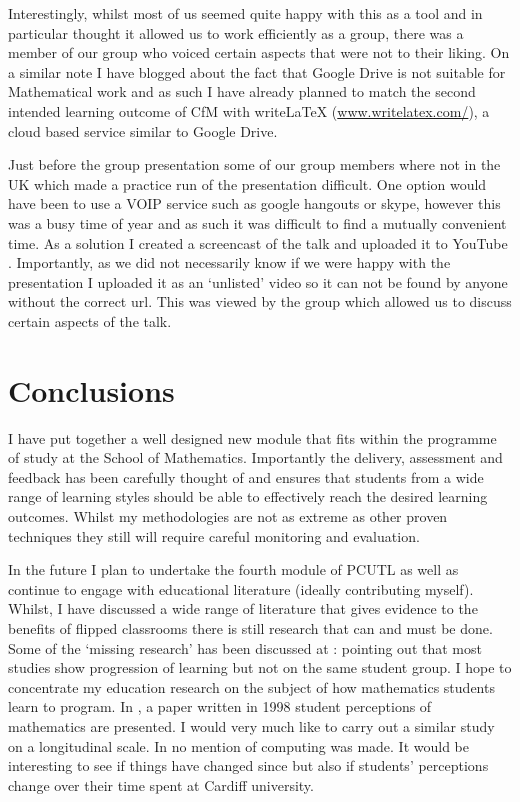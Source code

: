 \documentclass{article}
\begin{document}
Interestingly, whilst most of us seemed quite happy with this as a tool and in particular thought it allowed us to work efficiently as a group, there was a member of our group who voiced certain aspects that were not to their liking. On a similar note I have blogged about the fact that Google Drive is not suitable for Mathematical work \cite{knight_using_2012} and as such I have already planned to match the second intended learning outcome of CfM with writeLaTeX (\url{www.writelatex.com/}), a cloud based service similar to Google Drive.

Just before the group presentation some of our group members where not in the UK which made a practice run of the presentation difficult. One option would have been to use a VOIP service such as google hangouts or skype, however this was a busy time of year and as such it was difficult to find a mutually convenient time. As a solution I created a screencast of the talk and uploaded it to YouTube \cite{vincent_knight_understanding_2013}. Importantly, as we did not necessarily know if we were happy with the presentation I uploaded it as an `unlisted' video so it can not be found by anyone without the correct url. This was viewed by the group which allowed us to discuss certain aspects of the talk.

\section{Conclusions}

I have put together a well designed new module that fits within the programme of study at the School of Mathematics. Importantly the delivery, assessment and feedback has been carefully thought of and ensures that students from a wide range of learning styles should be able to effectively reach the desired learning outcomes. Whilst my methodologies are not as extreme as other proven techniques \cite{davis_how_2013} they still will require careful monitoring and evaluation.

In the future I plan to undertake the fourth module of PCUTL as well as continue to engage with educational literature (ideally contributing myself). Whilst, I have discussed a wide range of literature that gives evidence to the benefits of flipped classrooms there is still research that can and must be done. Some of the `missing research' has been discussed at \cite{weinberg_reviewing_2013}: pointing out that most studies show progression of learning but not on the same student group.  I hope to concentrate my education research on the subject of how mathematics students learn to program. In \cite{crawford_university_1998}, a paper written in 1998 student perceptions of mathematics are presented. I would very much like to carry out a similar study on a longitudinal scale. In \cite{crawford_university_1998} no mention of computing was made. It would be interesting to see if things have changed since but also if students' perceptions change over their time spent at Cardiff university.
\end{document}
